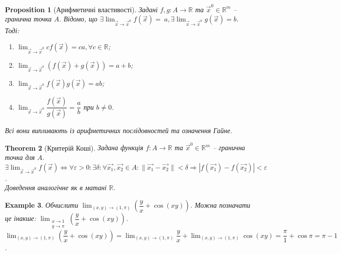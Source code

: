 \documentclass[a4paper, 10pt]{article}
\def\huge{\displaystyle}
\theoremstyle{theoremdd}
\newtheorem{theorem}{Theorem}[subsection]
\theoremstyle{theoremdd}
\theoremstyle{theoremdd}
\theoremstyle{theoremdd}
\theoremstyle{theoremdd}
\newtheorem{example}[theorem]{Example}
\theoremstyle{theoremdd}
\newtheorem{proposition}[theorem]{Proposition}
\theoremstyle{theoremdd}
\theoremstyle{theoremdd}
\theoremstyle{theoremdd}
\newcommand\Norm[1]{\|#1\|}
\begin{document}
\begin{proposition}[Арифметичні властивості]
Задані $f,g \colon A \to \mathbb{R}$ та $\vec{x}^0 \in \mathbb{R}^m$ -- гранична точка $A$. Відомо, що $\exists \huge \lim_{\vec{x} \to \vec{x}^0} f(\vec{x}) = ~{a}, \exists \lim_{\vec{x} \to \vec{x}^0} g(\vec{x}) = b$. Тоді:
\begin{enumerate}[nosep,wide=0pt,label={\arabic*)}]
\item $\huge \lim_{\vec{x} \to \vec{x}^0} cf(\vec{x}) = ca, \forall c \in \mathbb{R}$;
\item $\huge \lim_{\vec{x} \to \vec{x}^0} (f(\vec{x}) + g(\vec{x})) = a + b$;
\item $\huge \lim_{\vec{x} \to \vec{x}^0} f(\vec{x})g(\vec{x}) = ab$;
\item $\huge \lim_{\vec{x} \to \vec{x}^0} \dfrac{f(\vec{x})}{g(\vec{x})} = \dfrac{a}{b}$ при $b \neq 0$.
\end{enumerate}
\textit{Всі вони випливають із арифметичних послідовностей та означення Гайне.}
\end{proposition}

\begin{theorem}[Критерій Коші]
Задана функція $f \colon A \to \mathbb{R}$ та $\vec{x}^0 \in \mathbb{R}^m$ -- гранична точка для $A$.\\
$\exists \huge \lim_{\vec{x} \to \vec{x}^0} f(\vec{x}) \iff \forall \varepsilon > 0: \exists \delta: \forall \vec{x_1}, \vec{x_2} \in A: \Norm{\vec{x_1} - \vec{x_2}} < \delta \Rightarrow |f(\vec{x_1}) - f(\vec{x_2})| < \varepsilon$.\\
\textit{Доведення аналогічне як в матані $\mathbb{R}$.}
\end{theorem}

\begin{example}
Обчислити $\huge\lim_{(x,y) \to (1,\pi)} \left( \dfrac{y}{x} + \cos (xy) \right)$. Можна позначати це інакше: $\huge\lim_{\substack{x \to 1 \\ y \to \pi}} \left( \dfrac{y}{x} + \cos (xy) \right)$.\\
$\huge\lim_{(x,y) \to (1,\pi)} \left( \dfrac{y}{x} + \cos (xy) \right) = \lim_{(x,y) \to (1,\pi)} \dfrac{y}{x} + \lim_{(x,y) \to (1,\pi)} \cos (xy) = \dfrac{\pi}{1} + \cos \pi = \pi - 1$.
\end{example}
\end{document}

